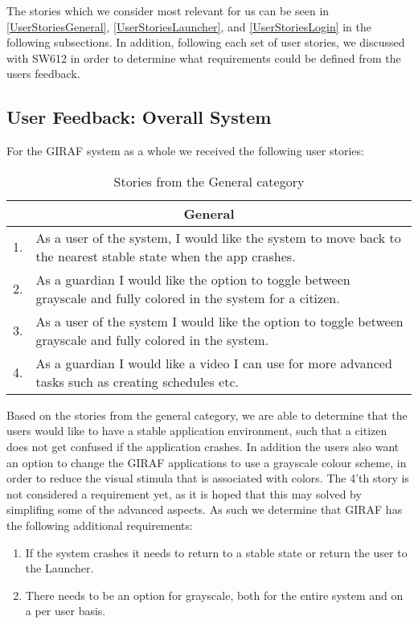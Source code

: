 The stories which we consider most relevant for us can be seen in
\autoref{UserStoriesGeneral}, \autoref{UserStoriesLauncher}, and
\autoref{UserStoriesLogin} in the following subsections. In addition, following
each set of user stories, we discussed with SW612 in order to determine what
requirements could be defined from the users feedback.

\subsection{User Feedback: Overall System}
For the GIRAF system as a whole we received the following user stories:
\begin{table}[H]
\begin{tabular}{|c|p{12.5cm}|}
\hline 
\multicolumn{2}{|c|}{General}\\\hline
1. & As a user of the system, I would like the system to move back to the
nearest stable state when the app crashes.\\\hline
2. & As a guardian I would like the option to toggle between grayscale and fully
colored in the system for a citizen. \\ \hline
3. & As a user of the system I would like the option to toggle between grayscale
and fully colored in the system. \\\hline
4. & As a guardian I would like a video I can use for more advanced tasks such
as creating schedules etc.\\\hline
\end{tabular}
\caption{Stories from the General category}
\label{UserStoriesGeneral}
\end{table}

Based on the stories from the general category, we are able to determine that
the users would like to have a stable application environment, such that a
citizen does not get confused if the application crashes. In addition the users
also want an option to change the GIRAF applications to use a grayscale colour
scheme, in order to reduce the visual stimula that is associated with colors.
The 4'th story is not considered a requirement yet, as it is hoped that this may
solved by simplifing some of the advanced aspects. As such we determine that
GIRAF has the following additional requirements:
\begin{enumerate}
  \item If the system crashes it needs to return to a stable state or return the
  user to the Launcher.
  \item There needs to be an option for grayscale, both for the entire system
  and on a per user basis.
\end{enumerate}

